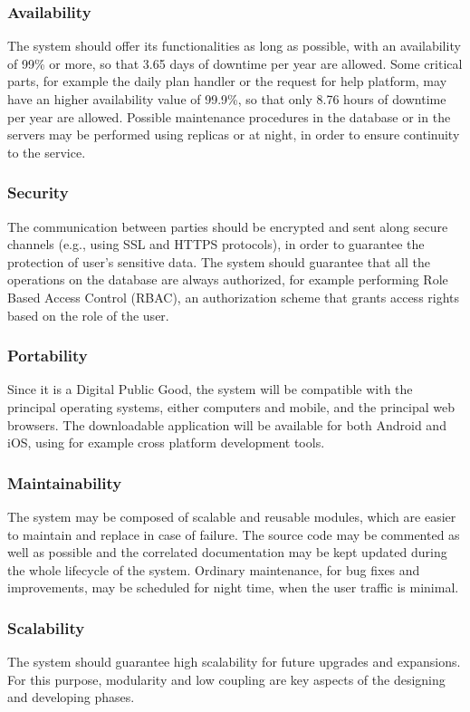 \subsubsection{Availability}
The system should offer its functionalities as long as possible, with an availability of 99\% or more, so that 3.65 days of downtime per year are allowed. Some critical parts, for example the daily plan handler or the request for help platform, may have an higher availability value of 99.9\%, so that only 8.76 hours of downtime per year are allowed. 
\newline
Possible maintenance procedures in the database or in the servers may be performed using replicas or at night, in order to ensure continuity to the service.
\subsubsection{Security}
The communication between parties should be encrypted and sent along secure channels (e.g., using SSL and HTTPS protocols), in order to guarantee the protection of user’s sensitive data. 
\newline
The system should guarantee that all the operations on the database are always authorized, for example performing Role Based Access Control (RBAC), an authorization scheme that grants access rights based on the role of the user.
\subsubsection{Portability}
Since it is a Digital Public Good, the system will be compatible with the principal operating systems, either computers and mobile, and the principal web browsers. The downloadable application will be available for both Android and iOS, using for example cross platform development tools.
\subsubsection{Maintainability}
The system may be composed of scalable and reusable modules, which are easier to maintain and replace in case of failure. The source code may be commented as well as possible and the correlated documentation may be kept updated during the whole lifecycle of the system. Ordinary maintenance, for bug fixes and improvements, may be scheduled for night time, when the user traffic is minimal.
\subsubsection{Scalability}
The system should guarantee high scalability for future upgrades and expansions. For this purpose, modularity and low coupling are key aspects of the designing and developing phases.